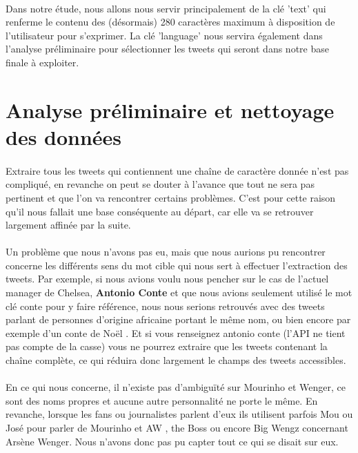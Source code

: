 \documentclass[14pt, openany]{article}
\begin{document}
\paragraph{}
Dans notre étude, nous allons nous servir principalement de la clé 'text' qui renferme le contenu des (désormais) 280 caractères maximum à disposition de l'utilisateur pour s'exprimer. La clé 'language' nous servira également dans l'analyse préliminaire pour sélectionner les tweets qui seront dans notre base finale à exploiter.
\section{Analyse préliminaire et nettoyage des données}
\paragraph{}
Extraire tous les tweets qui contiennent une chaîne de caractère donnée n'est pas compliqué, en revanche on peut se douter à l'avance que tout ne sera pas pertinent et que l'on va rencontrer certains problèmes. C'est pour cette raison qu'il nous fallait une base conséquente au départ, car elle va se retrouver largement affinée par la suite.
\paragraph{}
Un problème que nous n'avons pas eu, mais que nous aurions pu rencontrer concerne les différents sens du mot cible qui nous sert à effectuer l'extraction des tweets. Par exemple, si nous avions voulu nous pencher sur le cas de l'actuel manager de Chelsea, \textbf{Antonio Conte} et que nous avions seulement utilisé le mot clé \og conte \fg{} pour y faire référence, nous nous serions retrouvés avec des tweets parlant de personnes d'origine africaine portant le même nom, ou bien encore par exemple d'un \og conte de Noël \fg{}. Et si vous renseignez \og antonio conte \fg{} (l'API ne tient pas compte de la casse) vous ne pourrez extraire que les tweets contenant la chaîne complète, ce qui réduira donc largement le champs des tweets accessibles.
\paragraph{}
En ce qui nous concerne, il n'existe pas d'ambiguïté sur Mourinho et Wenger, ce sont des noms propres et aucune autre personnalité ne porte le même. En revanche, lorsque les fans ou journalistes parlent d'eux ils utilisent parfois \og Mou \fg{} ou \og José \fg{} pour parler de Mourinho et \og AW \fg{}, \og the Boss \fg{} ou encore \og Big Wengz \fg{} concernant Arsène Wenger. Nous n'avons donc pas pu capter tout ce qui se disait sur eux.
\end{document}
